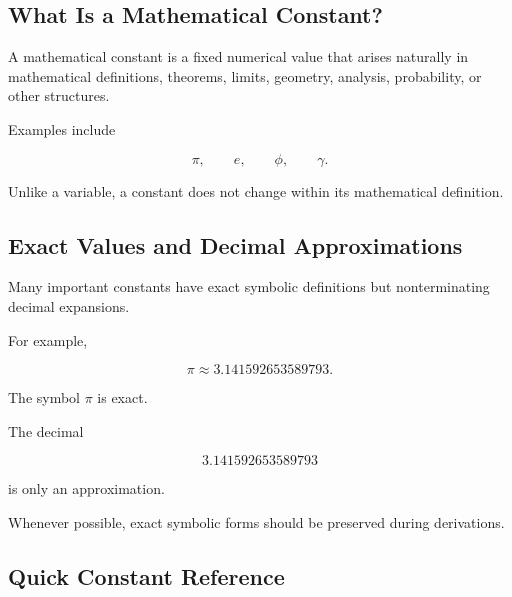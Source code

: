 \subsection{What Is a Mathematical Constant?}
\label{subsec:what-is-mathematical-constant}

A mathematical constant is a fixed numerical value that arises naturally in
mathematical definitions, theorems, limits, geometry, analysis, probability,
or other structures.

Examples include

\[
\boxed{
\pi,
\qquad
e,
\qquad
\phi,
\qquad
\gamma.
}
\]

Unlike a variable, a constant does not change within its mathematical
definition.

\subsection{Exact Values and Decimal Approximations}
\label{subsec:exact-versus-decimal-constants}

Many important constants have exact symbolic definitions but nonterminating
decimal expansions.

For example,

\[
\boxed{
\pi
\approx
3.141592653589793.
}
\]

The symbol \(\pi\) is exact.

The decimal

\[
3.141592653589793
\]

is only an approximation.

Whenever possible, exact symbolic forms should be preserved during
derivations.

\subsection{Quick Constant Reference}
\label{subsec:quick-constant-reference}

